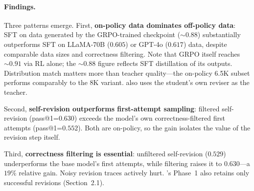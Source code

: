 \paragraph{Findings.}
Three patterns emerge.  First, \textbf{on-policy data dominates
off-policy data}: SFT on data generated by the GRPO-trained checkpoint
(${\sim}0.88$) substantially outperforms SFT on LLaMA-70B ($0.605$) or
GPT-4o ($0.617$) data, despite comparable data sizes and correctness
filtering.  Note that GRPO itself reaches ${\sim}0.91$ via RL alone;
the ${\sim}0.88$ figure reflects SFT distillation of its outputs.
Distribution match matters more than teacher quality---the on-policy
6.5K subset performs comparably to the 8K variant.  \ours{} also
uses the student's own reviser as the teacher.
 
Second, \textbf{self-revision outperforms first-attempt sampling}:
filtered self-revision (pass@1=$0.630$) exceeds the model's own
correctness-filtered first attempts (pass@1=$0.552$).  Both are on-policy, so
the gain isolates the value of the revision step itself.
 
Third, \textbf{correctness filtering is essential}: unfiltered
self-revision ($0.529$) underperforms the base model's first attempts,
while filtering raises it to $0.630$---a $19\%$ relative gain.  Noisy
revision traces actively hurt.  \ours{}'s Phase~1 also retains only
successful revisions (Section~2.1).
 
% 
% 
 
